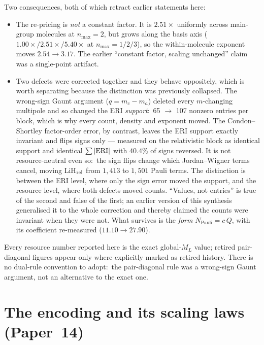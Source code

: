 \documentclass[aps,pra,twocolumn,superscriptaddress,longbibliography]{revtex4-2}
\newcommand{\gvq}[2]{#2}
\begin{document}
Two consequences, both of which retract earlier statements here:
\begin{itemize}
\item The re-pricing is \emph{not} a constant factor.  It is
$2.51\times$ uniformly across main-group molecules at $n_{\max}=2$, but
grows along the basis axis ($1.00\times/2.51\times/5.40\times$ at
$n_{\max}=1/2/3$), so the within-molecule exponent moves $2.54 \to 3.17$.
The earlier ``constant factor, scaling unchanged'' claim was a
single-point artifact.
\item Two defects were corrected together and they behave oppositely,
which is worth separating because the distinction was previously
collapsed.  The wrong-sign Gaunt argument ($q = m_c - m_a$) deleted every
$m$-changing multipole and so changed the ERI \emph{support}:\ 65
$\rightarrow$ \gvq{block_sp_n2_eri}{107} nonzero entries per block, which is why every count,
density and exponent moved.  The Condon--Shortley factor-order error, by
contrast, leaves the ERI support exactly invariant and flips signs only
--- measured on the relativistic block as identical support and identical $\sum|{\rm ERI}|$ with $40.4\%$ of signs reversed.
It is not resource-neutral even so:\ the sign flips change which
Jordan--Wigner terms cancel, moving LiH$_{\rm rel}$ from $1{,}413$ to
$\gvq{lih_rel_n2_pauli}{1{,}501}$ Pauli terms.  The distinction is between the ERI level, where
only the sign error moved the support, and the resource level, where both
defects moved counts.  ``Values,
not entries'' is true of the second and false of the first; an earlier
version of this synthesis generalised it to the whole correction and
thereby claimed the counts were invariant when they were not.  What
survives is the \emph{form} $N_{\mathrm{Pauli}} = c\,Q$, with its
coefficient re-measured ($11.10 \rightarrow \gvq{composed_coeff}{27.90}$).
\end{itemize}
Every resource number reported here is the exact global-$M_L$ value;
retired pair-diagonal figures appear only where explicitly marked as
retired history.  There is no dual-rule convention to adopt:\ the
pair-diagonal rule was a wrong-sign Gaunt argument, not an alternative to
the exact one.

\section{The encoding and its scaling laws (Paper~14)}
\end{document}

